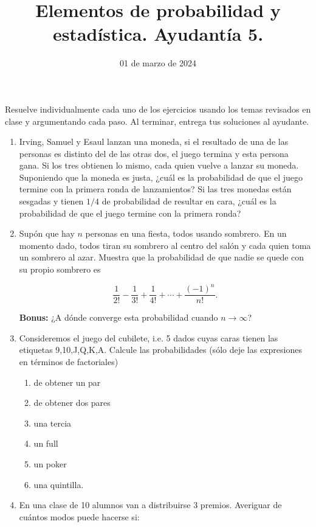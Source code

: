\documentclass{article}
\title{Elementos de probabilidad y estadística. Ayudantía 5.}
\date{01 de marzo de 2024}
\begin{document}
\maketitle

Resuelve individualmente cada uno de los ejercicios usando los temas revisados en clase y argumentando cada paso. Al terminar, entrega tus soluciones al ayudante.


\begin{enumerate}

    \item Irving, Samuel y Esaul lanzan una moneda, si el resultado de una de las personas es distinto del de las otras dos, el juego termina y esta persona gana. Si los tres obtienen lo mismo, cada quien vuelve a lanzar su moneda. Suponiendo que la moneda es justa, ¿cuál es la probabilidad de que el juego termine con la primera ronda de lanzamientos? Si las tres monedas están sesgadas y tienen $1/4$ de probabilidad de resultar en cara, ¿cuál es la probabilidad de que el juego termine con la primera ronda?
    
    \item Supón que hay $n$ personas en una fiesta, todos usando sombrero. En un momento dado, todos tiran su sombrero al centro del salón y cada quien toma un sombrero al azar. Muestra que la probabilidad de que nadie se quede con su propio sombrero es
    
    \[ \frac{1}{2!} - \frac{1}{3!} + \frac1{4!} + \cdots + \frac{(-1)^n}{n!}. \]

    \textbf{Bonus:} ¿A dónde converge esta probabilidad cuando $n\to\infty$?

    \item Consideremos el juego del cubilete, i.e. 5 dados cuyas caras tienen las etiquetas 9,10,J,Q,K,A. Calcule las probabilidades (sólo deje las expresiones en términos de factoriales)
    \begin{enumerate}
        \item de obtener un par
        \item de obtener dos pares
        \item una tercia
        \item un full
        \item un poker
        \item una quintilla.
    \end{enumerate}

    \item En una clase de 10 alumnos van a distribuirse 3 premios. Averiguar de cuántos modos puede hacerse si:


\end{enumerate}
\end{document}
